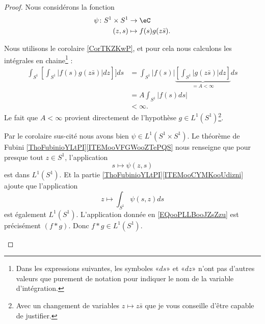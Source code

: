 \begin{proof}
	Nous considérons la fonction
	\begin{equation}
		\begin{aligned}
			\psi\colon S^1\times S^1 & \to \eC                 \\
			(z,s)                    & \mapsto f(s)g(z\bar s).
		\end{aligned}
	\end{equation}
	\begin{subproof}
		Nous utilisons le corolaire \ref{CorTKZKwP}, et pour cela nous calculons les intégrales en chaine\footnote{Dans les expressions suivantes, les symboles «\( ds\)» et «\( dz\)» n'ont pas d'autres valeurs que purement de notation pour indiquer le nom de la variable d'intégration.} :
		\begin{subequations}
			\begin{align}
				\int_{S^1}\left[ \int_{S^1}| f(s)g(z\bar s) |dz \right]]ds & =\int_{S^1}| f(s) |\underbrace{\left[ \int_{S^1}| g(z\bar s) |dz \right]}_{=A<\infty}ds \\
				                                                           & =A\int_{S^1}| f(s)ds |                                                                  \\
				                                                           & <\infty.
			\end{align}
		\end{subequations}
		Le fait que \( A<\infty\) provient directement de l'hypothèse \( g\in L^1(S^1)\)\footnote{Avec un changement de variables \( z\mapsto z\bar s\) que je vous conseille d'être capable de justifier.}.

		Par le corolaire sus-cité nous avons bien \( \psi\in L^1(S^1\times S^1)\).
		Le théorème de Fubini \ref{ThoFubinioYLtPI}\ref{ITEMooVFGWooZTePQS} nous renseigne que pour presque tout \( z\in S^1\), l'application
		\begin{equation}
			s\mapsto \psi(z,s)
		\end{equation}
		est dans \( L^1(S^1)\). Et la partie \ref{ThoFubinioYLtPI}\ref{ITEMooCYMKooUdizni} ajoute que l'application
		\begin{equation}        \label{EQooPLLBooJZsZzu}
			z\mapsto \int_{S^1}\psi(s,z)ds
		\end{equation}
		est également \( L^1(S^1)\).
		\spitem[Conclusion]
		L'application donnée en \eqref{EQooPLLBooJZsZzu} est précisément \( (f*g)\). Donc \( f*g\in L^1(S^1)\).
	\end{subproof}
\end{proof}

